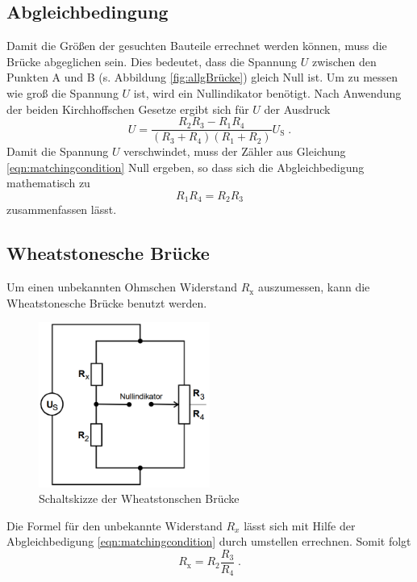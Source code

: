 \subsection{Abgleichbedingung}
Damit die Größen der gesuchten Bauteile errechnet werden können, muss die Brücke abgeglichen sein. Dies bedeutet, dass die Spannung $U$ zwischen den Punkten A und B (s. 
Abbildung \ref{fig:allgBrücke}) gleich Null ist. Um zu messen wie groß die Spannung $U$ ist, wird ein Nullindikator benötigt.
Nach Anwendung der beiden Kirchhoffschen Gesetze ergibt sich für $U$ der Ausdruck  
\begin{equation}
    U = \frac{R_2 R_3 - R_1 R_4}{\left( R_3 + R_4 \right) \left( R_1 + R_2\right)} U_\text{S} \; \text{.} \label{eqn:matchingcondition}
\end{equation}
Damit die Spannung $U$ verschwindet, muss der Zähler aus Gleichung \eqref{eqn:matchingcondition} Null ergeben, so dass sich die Abgleichbedigung mathematisch zu
\begin{equation}
    R_1 R_4 = R_2 R_3 \label{fig:matchingcondition}
\end{equation}
zusammenfassen lässt. 
\subsection{Wheatstonesche Brücke} \label{subsec:Wheat}
Um einen unbekannten Ohmschen Widerstand $R_\text{x}$ auszumessen, kann die Wheatstonesche Brücke benutzt werden. 
\begin{figure}
    \centering
    \caption{Schaltskizze der Wheatstonschen Brücke}
    \label{fig:Wheatstone}
    \includegraphics[width = 0.5\textwidth]{bridges/wheat.png}
\end{figure}
Die Formel für den unbekannte Widerstand $R_x$ lässt sich mit Hilfe der Abgleichbedigung \eqref{eqn:matchingcondition} durch umstellen errechnen. Somit folgt 
\begin{equation}
    R_\text{x} = R_2 \frac{R_3}{R_4} \; \text{.} \label{eqn:wheat}
\end{equation}
